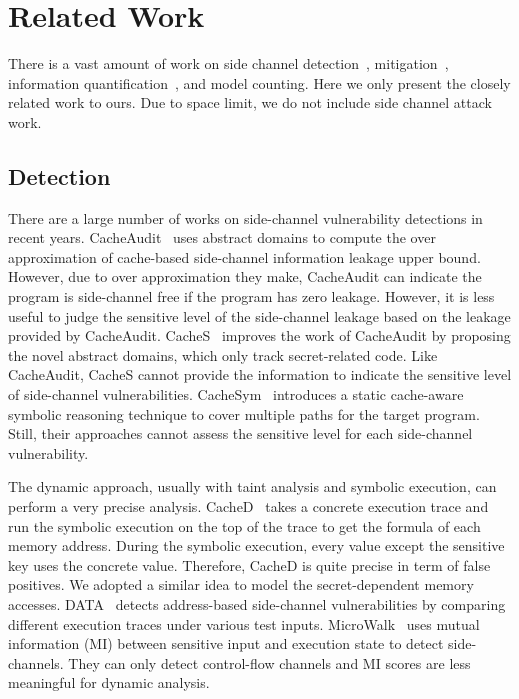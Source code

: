\section{Related Work}

There is a vast amount of work on 
side channel 
detection~\cite{182946, 236338, Brotzman19Casym, 203878,217537,Wichelmann:2018:MFF:3274694.3274741,langley2010ctgrind}, 
mitigation~\cite{Page2005PartitionedCA,
Wang:2007:NCD:1250662.1250723,Zhang:2015:HDL:2775054.2694372,Li:2014:SLH:2541940.2541947,
236344,shih2017t,Coppens:2009:PMT:1607723.1608124,
brickell2006software,crane2015thwarting}, 
information
quantification~\cite{10.1007/978-3-642-31424-7_40,McCamantE2008,5207642,Phan:2012:SQI:2382756.2382791,Chattopadhyay:2017:QIL:3127041.3127044}, 
and model counting.
Here we only present the closely related work to ours.
Due to space limit, we do not include side channel attack work.

\subsection{Detection}

There are a large number of works on side-channel vulnerability detections in
recent years.  CacheAudit~\cite{182946} uses abstract domains to compute the
over approximation of cache-based side-channel information leakage upper bound.
However, due to over approximation they make, CacheAudit can indicate the
program is side-channel free if the program has zero leakage.  However, it is
less useful to judge the sensitive level of the side-channel leakage based on
the leakage provided by CacheAudit. CacheS~\cite{236338} improves the work of
CacheAudit by proposing the novel abstract domains, which only track
secret-related code. Like CacheAudit, CacheS cannot provide the information to
indicate the sensitive level of side-channel vulnerabilities.
CacheSym~\cite{Brotzman19Casym} introduces a static cache-aware symbolic
reasoning technique to cover multiple paths for the target program. Still, their
approaches cannot assess the sensitive level for each side-channel
vulnerability.

The dynamic approach, usually with taint analysis and symbolic execution,
can perform a very precise analysis. CacheD~\cite{203878} takes a concrete
 execution trace and run the symbolic execution on the top of the trace
to get the formula of each memory address. During the symbolic execution, every
value except the sensitive key uses the concrete value. Therefore, CacheD is
quite precise in term of false positives. We adopted a similar idea to model the
secret-dependent memory accesses. DATA~\cite{217537} detects address-based
side-channel vulnerabilities by comparing different execution traces under
various test inputs. MicroWalk~\cite{Wichelmann:2018:MFF:3274694.3274741} uses
mutual information (MI) between sensitive input and execution state to detect
side-channels. They can only detect control-flow channels and MI scores are less
meaningful for dynamic analysis.

